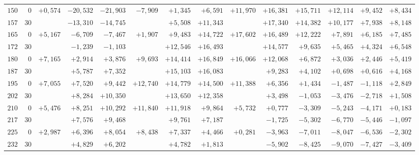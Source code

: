 \begin{landscape}
\begin{longtable}{@{}rr|r|r|r|r|r|r|r|r|r|r|r|r@{}}
\(150\) & \(0\) & \(+0{,}574\) & \(-20{,}532\) & \(-21{,}903\) & \(-7{,}909\) & \(+1{,}345\) & \(+6{,}591\) & \(+11{,}970\) & \(+16{,}381\) & \(+15{,}711\) & \(+12{,}114\) & \(+9{,}452\) & \(+8{,}434\)\\
\(157\) & \(30\) &  & \(-13{,}310\) & \(-14{,}745\) &  & \(+5{,}508\) & \(+11{,}343\) &  & \(+17{,}340\) & \(+14{,}382\) & \(+10{,}177\) & \(+7{,}938\) & \(+8{,}148\)\\
\(165\) & \(0\) & \(+5{,}167\) & \(-6{,}709\) & \(-7{,}467\) & \(+1{,}907\) & \(+9{,}483\) & \(+14{,}722\) & \(+17{,}602\) & \(+16{,}489\) & \(+12{,}222\) & \(+7{,}891\) & \(+6{,}185\) & \(+7{,}485\)\\
\(172\) & \(30\) &  & \(-1{,}239\) & \(-1{,}103\) &  & \(+12{,}546\) & \(+16{,}493\) &  & \(+14{,}577\) & \(+9{,}635\) & \(+5{,}465\) & \(+4{,}324\) & \(+6{,}548\)\\[2pt]
\(180\) & \(0\) & \(+7{,}165\) & \(+2{,}914\) & \(+3{,}876\) & \(+9{,}693\) & \(+14{,}414\) & \(+16{,}849\) & \(+16{,}066\) & \(+12{,}068\) & \(+6{,}872\) & \(+3{,}036\) & \(+2{,}446\) & \(+5{,}419\)\\
\(187\) & \(30\) &  & \(+5{,}787\) & \(+7{,}352\) &  & \(+15{,}103\) & \(+16{,}083\) &  & \(+9{,}283\) & \(+4{,}102\) & \(+0{,}698\) & \(+0{,}616\) & \(+4{,}168\)\\
\(195\) & \(0\) & \(+7{,}055\) & \(+7{,}520\) & \(+9{,}442\) & \(+12{,}740\) & \(+14{,}779\) & \(+14{,}500\) & \(+11{,}388\) & \(+6{,}356\) & \(+1{,}434\) & \(-1{,}487\) & \(-1{,}118\) & \(+2{,}849\)\\
\(202\) & \(30\) &  & \(+8{,}284\) & \(+10{,}350\) &  & \(+13{,}650\) & \(+12{,}358\) &  & \(+3{,}498\) & \(-1{,}053\) & \(-3{,}476\) & \(-2{,}718\) & \(+1{,}508\)\\[2pt]
\(210\) & \(0\) & \(+5{,}476\) & \(+8{,}251\) & \(+10{,}292\) & \(+11{,}840\) & \(+11{,}918\) & \(+9{,}864\) & \(+5{,}732\) & \(+0{,}777\) & \(-3{,}309\) & \(-5{,}243\) & \(-4{,}171\) & \(+0{,}183\)\\
\(217\) & \(30\) &  & \(+7{,}576\) & \(+9{,}468\) &  & \(+9{,}761\) & \(+7{,}187\) &  & \(-1{,}725\) & \(-5{,}302\) & \(-6{,}770\) & \(-5{,}446\) & \(-1{,}097\)\\
\(225\) & \(0\) & \(+2{,}987\) & \(+6{,}396\) & \(+8{,}054\) & \(+8{,}438\) & \(+7{,}337\) & \(+4{,}466\) & \(+0{,}281\) & \(-3{,}963\) & \(-7{,}011\) & \(-8{,}047\) & \(-6{,}536\) & \(-2{,}302\)\\
\(232\) & \(30\) &  & \(+4{,}829\) & \(+6{,}202\) &  & \(+4{,}782\) & \(+1{,}813\) &  & \(-5{,}902\) & \(-8{,}425\) & \(-9{,}070\) & \(-7{,}427\) & \(-3{,}409\)\\[2pt]

\end{longtable}
\end{landscape}
